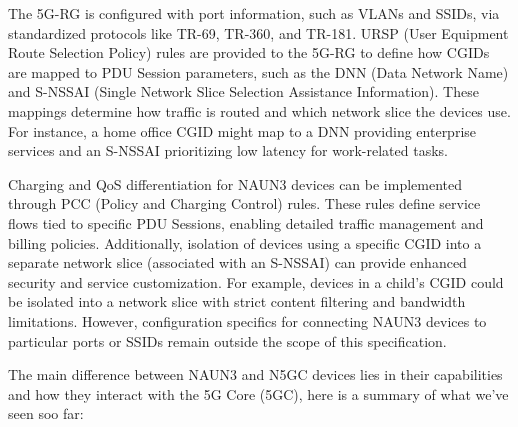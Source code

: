 The 5G-RG is configured with port information, such as VLANs and SSIDs, via standardized protocols like TR-69, TR-360, and TR-181. URSP (User Equipment Route Selection Policy) rules are provided to the 5G-RG to define how CGIDs are mapped to PDU Session parameters, such as the DNN (Data Network Name) and S-NSSAI (Single Network Slice Selection Assistance Information). These mappings determine how traffic is routed and which network slice the devices use. For instance, a home office CGID might map to a DNN providing enterprise services and an S-NSSAI prioritizing low latency for work-related tasks.

Charging and QoS differentiation for NAUN3 devices can be implemented through PCC (Policy and Charging Control) rules. These rules define service flows tied to specific PDU Sessions, enabling detailed traffic management and billing policies. Additionally, isolation of devices using a specific CGID into a separate network slice (associated with an S-NSSAI) can provide enhanced security and service customization. For example, devices in a child’s CGID could be isolated into a network slice with strict content filtering and bandwidth limitations. However, configuration specifics for connecting NAUN3 devices to particular ports or SSIDs remain outside the scope of this specification.%

The main difference between NAUN3 and N5GC devices lies in their capabilities and how they interact with the 5G Core (5GC), here is a summary of what we've seen soo far:

